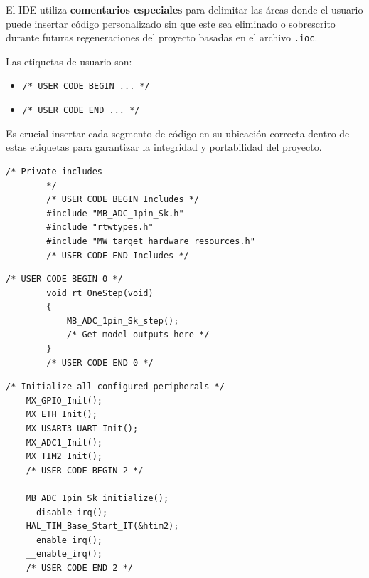 El IDE utiliza \textbf{comentarios especiales} para delimitar las áreas donde el usuario puede insertar código personalizado sin que este sea eliminado o sobrescrito durante futuras regeneraciones del proyecto basadas en el archivo \texttt{.ioc}.

Las etiquetas de usuario son:
\begin{itemize}
	\item \texttt{/* USER CODE BEGIN ... */}
	\item \texttt{/* USER CODE END ... */}
\end{itemize}

Es crucial insertar cada segmento de código en su ubicación correcta dentro de estas etiquetas para garantizar la integridad y portabilidad del proyecto.
\vspace{0.2cm}

\begin{minipage}{\textwidth}
	\begin{lstlisting}[caption={Inclusión de la librería dentro del main.c }, label={lst:lib5}]
		/* Private includes ----------------------------------------------------------*/
		/* USER CODE BEGIN Includes */
		#include "MB_ADC_1pin_Sk.h"
		#include "rtwtypes.h"
		#include "MW_target_hardware_resources.h"
		/* USER CODE END Includes */
	\end{lstlisting}
\end{minipage}	

\begin{minipage}{\textwidth}
	\begin{lstlisting}[caption={Inclusión de la función proporcionada dentro del user code begin.}, label={lst:lib6}]
		/* USER CODE BEGIN 0 */
		void rt_OneStep(void)
		{
			MB_ADC_1pin_Sk_step();
			/* Get model outputs here */
		}
		/* USER CODE END 0 */
	\end{lstlisting}
\end{minipage}	

\begin{minipage}{\textwidth}
	\begin{lstlisting}[caption={Llamada a la función de inicialización y la habilitación del TIM2 con su correspondiente interrupción. }, label={lst:lib7}]
	 /* Initialize all configured peripherals */
	MX_GPIO_Init();
	MX_ETH_Init();
	MX_USART3_UART_Init();
	MX_ADC1_Init();
	MX_TIM2_Init();
	/* USER CODE BEGIN 2 */
	
	MB_ADC_1pin_Sk_initialize();
	__disable_irq();
	HAL_TIM_Base_Start_IT(&htim2);
	__enable_irq();
	__enable_irq();
	/* USER CODE END 2 */
	\end{lstlisting}
\end{minipage}	

